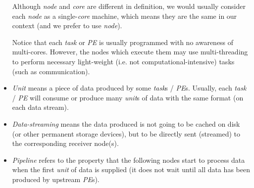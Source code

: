 \begin{itemize}
\begin{term_box}
Although \emph{node} and \emph{core} are different in definition, we would usually consider each \emph{node} as a single-\emph{core} machine, which means they are the same in our context (and we prefer to use \emph{node}).
\end{term_box}	

\begin{term_box}
Notice that each \emph{task} or \emph{PE} is usually programmed with no awareness of multi-cores. However, the nodes which execute them may use multi-threading to perform necessary light-weight (i.e. not computational-intensive) tasks (such as communication).
\end{term_box}
	
\item \emph{Unit} means a piece of data produced by some \emph{task}s / \emph{PE}s. Usually, each \emph{task} / \emph{PE} will consume or produce many \emph{unit}s of data with the same format (on each data stream).

\item \emph{Data-streaming} means the data produced is not going to be cached on disk (or other permanent storage devices), but to be directly sent (\ie streamed) to the corresponding receiver node(s).

\item \emph{Pipeline} refers to the property that the following nodes start to process data when the first \emph{unit} of data is supplied (\ie it does not wait until all data has been produced by upstream \emph{PE}s).

\end{itemize}

